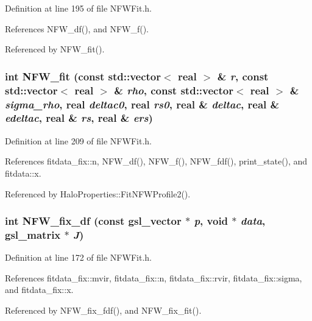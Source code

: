 Definition at line 195 of file NFWFit.h.



References NFW\_\-df(), and NFW\_\-f().



Referenced by NFW\_\-fit().

\subsubsection[{NFW\_\-fit}]{\setlength{\rightskip}{0pt plus 5cm}int NFW\_\-fit (const std::vector$<$ {\bf real} $>$ \& {\em r}, \/  const std::vector$<$ {\bf real} $>$ \& {\em rho}, \/  const std::vector$<$ {\bf real} $>$ \& {\em sigma\_\-rho}, \/  {\bf real} {\em deltac0}, \/  {\bf real} {\em rs0}, \/  {\bf real} \& {\em deltac}, \/  {\bf real} \& {\em edeltac}, \/  {\bf real} \& {\em rs}, \/  {\bf real} \& {\em ers})}\label{NFWFit_8h_a29002cac08d9dde704e3e08ebdadb2da}


Definition at line 209 of file NFWFit.h.



References fitdata\_\-fix::n, NFW\_\-df(), NFW\_\-f(), NFW\_\-fdf(), print\_\-state(), and fitdata::x.



Referenced by HaloProperties::FitNFWProfile2().

\subsubsection[{NFW\_\-fix\_\-df}]{\setlength{\rightskip}{0pt plus 5cm}int NFW\_\-fix\_\-df (const gsl\_\-vector $\ast$ {\em p}, \/  void $\ast$ {\em data}, \/  gsl\_\-matrix $\ast$ {\em J})}\label{NFWFit_8h_aa2cccd6dba4f92be1466604b59ed62c3}


Definition at line 172 of file NFWFit.h.



References fitdata\_\-fix::mvir, fitdata\_\-fix::n, fitdata\_\-fix::rvir, fitdata\_\-fix::sigma, and fitdata\_\-fix::x.



Referenced by NFW\_\-fix\_\-fdf(), and NFW\_\-fix\_\-fit().


